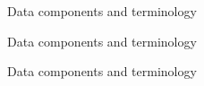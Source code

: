 \documentclass[table]{beamer}\usepackage[]{graphicx}\usepackage[]{color}
\begin{document}
\begin{frame}{Data components and terminology}
\end{frame}

\begin{frame}{Data components and terminology}
\end{frame}

\begin{frame}{Data components and terminology}
\end{frame}
\end{document}
